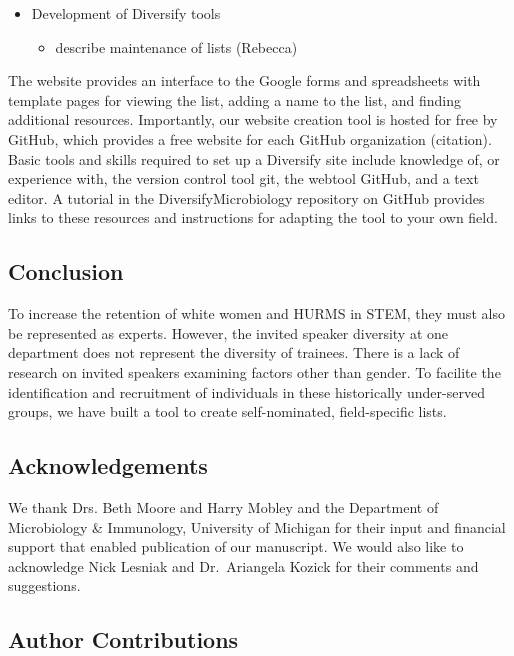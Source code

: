 \documentclass[10pt,]{article}
\providecommand{\tightlist}{%
  \setlength{\itemsep}{0pt}\setlength{\parskip}{0pt}}
\begin{document}
\begin{itemize}
\tightlist
\item
  Development of Diversify tools

  \begin{itemize}
  \tightlist
  \item
    describe maintenance of lists (Rebecca)
  \end{itemize}
\end{itemize}

The website provides an interface to the Google forms and spreadsheets
with template pages for viewing the list, adding a name to the list, and
finding additional resources. Importantly, our website creation tool is
hosted for free by GitHub, which provides a free website for each GitHub
organization (citation). Basic tools and skills required to set up a
Diversify site include knowledge of, or experience with, the version
control tool git, the webtool GitHub, and a text editor. A tutorial in
the DiversifyMicrobiology repository on GitHub provides links to these
resources and instructions for adapting the tool to your own field.

\subsection{Conclusion}\label{conclusion}

To increase the retention of white women and HURMS in STEM, they must
also be represented as experts. However, the invited speaker diversity
at one department does not represent the diversity of trainees. There is
a lack of research on invited speakers examining factors other than
gender. To facilite the identification and recruitment of individuals in
these historically under-served groups, we have built a tool to create
self-nominated, field-specific lists.

\subsection{Acknowledgements}\label{acknowledgements}

We thank Drs. Beth Moore and Harry Mobley and the Department of
Microbiology \& Immunology, University of Michigan for their input and
financial support that enabled publication of our manuscript. We would
also like to acknowledge Nick Lesniak and Dr.~Ariangela Kozick for their
comments and suggestions.

\subsection{Author Contributions}\label{author-contributions}
\end{document}
